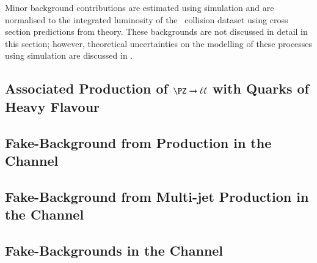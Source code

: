 Minor background contributions are estimated using simulation and are normalised
to the integrated luminosity of the \pp~collision dataset using cross section
predictions from theory. These backgrounds are not discussed in detail in this
section; however, theoretical uncertainties on the modelling of these processes
using simulation are discussed in .

\subsection{Associated Production of $\PZ \to \ell\ell$ with Quarks of Heavy Flavour}%
\label{sec:bkg_zjets}


\subsection{Fake-\tauhadvis Background from \ttbar Production in the \hadhad Channel}%
\label{sec:bkg_hadhad_ttbarfakes}


\subsection{Fake-\tauhadvis Background from Multi-jet Production in the \hadhad Channel}%
\label{sec:bkg_hadhad_ff}%
\label{sec:hadhad_multijet}


\subsection{Fake-\tauhadvis Backgrounds in the \lephad Channel}%
\label{sec:bkg_lephad_combined_ff}



